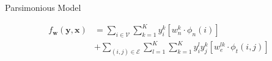 \documentclass{beamer}
\newcommand{\x}{{\mathbf x}}     %
\newcommand{\y}{{\mathbf y}}     %
\newcommand{\ysc}[2]{{y_{#1}^{#2}}}    %
\newcommand{\fn}[1]{{\phi_n(#1)}}      %
\newcommand{\fe}[3]{{\phi_{#1}(#2,#3)}}%
\newcommand{\w}{{\mathbf w}}           %
\newcommand{\wn}[1]{{w_n^{#1}}}        %
\newcommand{\we}[3]{{w_{#1}^{#2#3}}}   %
\newcommand{\df}[3]{{f_{#3}(#1,#2)}}   %
\begin{document}

\begin{frame}{Parsimonious Model}

\begin{equation} \label{eq:model}
\begin{split}
\df{\y}{\x}{\w} & = \sum_{i \in \mathcal{V}} \sum_{k=1}^{K} \ysc{i}{k} \left[\wn{k} \cdot \fn{i} \right] \\
 & + \sum_{(i,j)\in \mathcal{E}}   \sum_{l=1}^{K}  \sum_{k=1}^{K} \ysc{i}{l} \ysc{j}{k}  \left[\we{e}{l}{k} \cdot \fe{t}{i}{j}\right] 
 \end{split}
\end{equation}

\end{frame}
\end{document}
